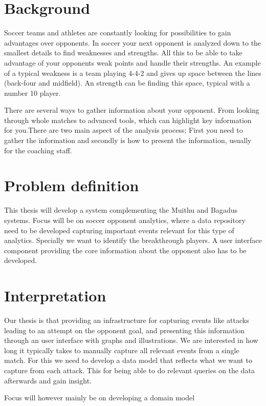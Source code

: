 \section{Background}

Soccer teams and athletes are constantly looking for possibilities to gain advantages over opponents. In soccer your next opponent is analyzed down to the smallest details to find weaknesses and strengths. All this to be able to take advantage of your opponents weak points and handle their strengths. An example of a typical weakness is a team playing 4-4-2 and gives up space between the lines (back-four and midfield). An strength can be finding this space, typical with a number 10 player.

There are several ways to gather information about your opponent. From looking through whole matches to advanced tools, which can highlight key information for you.There are two main aspect of the analysis process; First you need to gather the information and secondly is how to present the information, usually for the coaching staff.

\section{Problem definition}

This thesis will develop a system complementing the Muithu and Bagadus systems. Focus will be on soccer opponent analytics, where a data repository need to be developed capturing important events relevant for this type of analytics. Specially we want to identify the breakthrough players. A user interface component providing the core information about the opponent also has to be developed. 

\section{Interpretation}

Our thesis is that providing an infrastructure for capturing events like attacks leading to an attempt on the opponent goal, and presenting this information through an user interface with graphs and illustrations. We are interested in how long it typically takes to manually capture all relevant events from a single match. For this we need to develop a data model that reflects what we want to capture from each attack. This for being able to do relevant queries on the data afterwards and gain insight.

Focus will however mainly be on developing a domain model 


